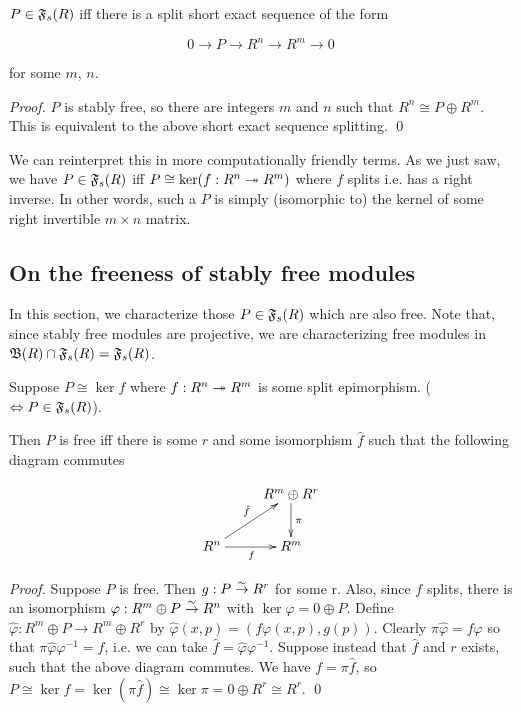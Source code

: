 \begin{proposition}
\label{prop:stablyfree_char}
  $ P \in \mathfrak{F}_s(R)$ iff there is a split short exact sequence of the form
  
  \[
    0 \rightarrow P \rightarrow R^n \rightarrow R^m \rightarrow 0
  \]

  for some $m$, $n$.
\end{proposition}
\begin{proof}
  $P$ is stably free, so there are integers $m$ and $n$ such that $R^n \cong P \oplus R^m$.
  This is equivalent to the above short exact sequence splitting.
  \qed
\end{proof}

We can reinterpret this in more computationally friendly terms.
As we just saw, we have $P \in \mathfrak{F}_s(R)$ iff $P \cong \ker(f: R^n \twoheadrightarrow R^m)$ where $f$ splits i.e. has a right inverse.
In other words, such a $P$ is simply (isomorphic to) the kernel of some right invertible $m \times n$ matrix.

\subsection{On the freeness of stably free modules}

In this section, we characterize those $P \in \mathfrak{F}_s(R)$ which are also free.
Note that, since stably free modules are projective, we are characterizing free modules in $\mathfrak B(R) \cap \mathfrak{F}_s(R) = \mathfrak{F}_s(R)$.

\begin{proposition}
  Suppose $P \cong \ker f$ where $f: R^n \twoheadrightarrow R^m$ is some split epimorphism.
  ($\Leftrightarrow P \in \mathfrak{F}_s(R)$).

  Then $P$ is free iff there is some $r$ and some isomorphism $\hat f$ such that the following diagram commutes

  \begin{displaymath}
    \xymatrix{                         & R^m \oplus R^r \ar[d]^\pi \\
         R^n \ar[r]_f \ar[ur]^{\hat f} & R^m                       \\ }
  \end{displaymath}
\end{proposition}
\begin{proof}
  Suppose $P$ is free. Then $g: P \overset\sim\to R^r$ for some r.
  Also, since $f$ splits, there is an isomorphism $\varphi: R^m \oplus P \overset\sim\to R^n$ with $\ker \varphi = 0 \oplus P$.
  Define $\hat \varphi: R^m \oplus P \rightarrow R^m \oplus R^r$ by $\hat \varphi(x,p) = (f \varphi(x,p), g(p) )$.
  Clearly $\pi \hat \varphi = f \varphi$ so that $\pi \hat \varphi \varphi^{-1} = f$, i.e. we can take $\hat f = \hat \varphi \varphi^{-1}$.
  Suppose instead that $\hat f$ and $r$ exists, such that the above diagram commutes.
  We have $f = \pi \hat f$, so $P \cong \ker f = \ker (\pi \hat f) \cong \ker \pi = 0 \oplus R^r \cong R^r$.
  \qed
\end{proof}

